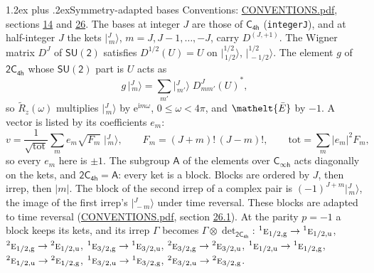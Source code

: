 \documentclass[10pt,a4paper]{article}
\makeatletter
\renewcommand\section{\@startsection{section}{1}{\z@}{-3ex plus -1ex minus -.2ex}%
  {1.2ex plus .2ex}{\normalfont\large\sffamily\bfseries\color{parttitle}}}
\numberwithin{equation}{section}
\newcommand{\eltfont}[1]{{\let\sigma\eltsigma\mathelt{#1}}}
\newcommand{\grp}[1]{\mathsf{#1}}
\newcommand{\irr}[1]{\text{\normalfont\scshape #1}}
\newcommand{\conjpair}[1]{{}^{#1}}
\newcommand{\elt}[1]{\eltfont{#1}}
\newcommand{\ptag}[1]{\mathrm{#1}}
\newcommand{\iunit}{\mathrm{i}}
\newcommand{\expe}{\mathrm{e}}
\newcommand{\irrJp}[2]{D^{(#1,#2)}}
\newcommand{\wignerD}[1]{D^{#1}}
\newcommand{\conj}[1]{{#1}^{*}}
\newcommand{\irrprod}{\otimes}
\newcommand{\jm}[2]{\bigl\lvert{}^{#1}_{\,#2}\bigr\rangle}
\newcommand{\barred}[1]{\bar{#1}}
\newcommand{\lift}[1]{\tilde{#1}}
\makeatother
\begin{document}
\section{Symmetry-adapted bases}\label{s:bases}
Conventions: \href{../../CONVENTIONS.pdf}{CONVENTIONS.pdf}, sections \href{../../../rotation/CONVENTIONS.pdf\#conv.14}{14} and \href{../../CONVENTIONS.pdf\#conv.26}{26}.
\leavevmode\label{n:index.m}\label{n:vector.ket}The bases at integer $J$ are those of \href{../../../rotation/data/pdf/C4h.pdf}{$\grp{C_{4h}}$} (\texttt{integerJ}), and at half-integer $J$ the kets $\jm{J}{m}$, $m = J, J-1, \dots, -J$, carry $\irrJp{J}{+1}$. \label{n:matrix.wigner}The Wigner matrix $\wignerD{J}$ of $\grp{SU(2)}$ satisfies $\wignerD{1/2}(U) = U$ on $\jm{1/2}{1/2}$, $\jm{1/2}{-1/2}$. The element $g$ of $\grp{2C_{4h}}$ whose $\grp{SU(2)}$ part is $U$ acts as
\begin{equation}\label{e:action}g\,\jm{J}{m} = \sum_{m'} \jm{J}{m'}\; \conj{\wignerD{J}_{m m'}(U)},\end{equation}
so $\lift{R}_{z}(\omega)$ multiplies $\jm{J}{m}$ by $\expe^{\iunit m\omega}$, $0 \le \omega < 4\pi$, and $\elt{\barred{E}}$ by $-1$. \label{n:index.ketcoefficient}\label{n:vector.basis.symmetry}\label{n:index.ketweight}\label{n:index.total}A vector is listed by its coefficients $e_m$:
\begin{equation}\label{e:ket}v = \frac{1}{\sqrt{\mathrm{tot}}}\sum_m e_m\sqrt{F_m}\;\jm{J}{m},\qquad F_m = (J+m)!\,(J-m)!,\qquad \mathrm{tot} = \sum_m |e_m|^2F_m,\end{equation}
so every $e_m$ here is $\pm 1$.
\leavevmode\label{n:group.A}The subgroup $\grp{A}$ of the elements over $\grp{C_{\infty h}}$ acts diagonally on the kets, and $\grp{2C_{4h}} = \grp{A}$: every ket is a block. Blocks are ordered by $J$, then irrep, then $|m|$. The block of the second irrep of a complex pair is $(-1)^{J+m}\jm{J}{m}$, the image of the first irrep's $\jm{J}{-m}$ under time reversal. These blocks are adapted to time reversal (\href{../../CONVENTIONS.pdf}{CONVENTIONS.pdf}, section \href{../../CONVENTIONS.pdf\#conv.26.1}{26.1}).
At the parity $p = -1$ a block keeps its kets, and its irrep $\Gamma$ becomes $\Gamma \irrprod \det_{\grp{2C_{4h}}}$: $\conjpair{1}\irr{e}_{1/2,\ptag{g}} \to \conjpair{1}\irr{e}_{1/2,\ptag{u}}$, $\conjpair{2}\irr{e}_{1/2,\ptag{g}} \to \conjpair{2}\irr{e}_{1/2,\ptag{u}}$, $\conjpair{1}\irr{e}_{3/2,\ptag{g}} \to \conjpair{1}\irr{e}_{3/2,\ptag{u}}$, $\conjpair{2}\irr{e}_{3/2,\ptag{g}} \to \conjpair{2}\irr{e}_{3/2,\ptag{u}}$, $\conjpair{1}\irr{e}_{1/2,\ptag{u}} \to \conjpair{1}\irr{e}_{1/2,\ptag{g}}$, $\conjpair{2}\irr{e}_{1/2,\ptag{u}} \to \conjpair{2}\irr{e}_{1/2,\ptag{g}}$, $\conjpair{1}\irr{e}_{3/2,\ptag{u}} \to \conjpair{1}\irr{e}_{3/2,\ptag{g}}$, $\conjpair{2}\irr{e}_{3/2,\ptag{u}} \to \conjpair{2}\irr{e}_{3/2,\ptag{g}}$.
\end{document}
